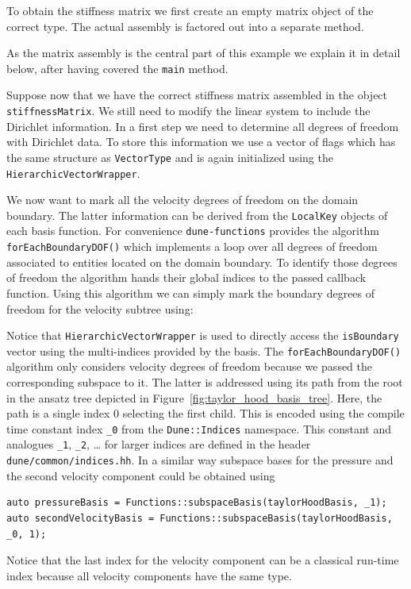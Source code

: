 \documentclass[a4paper,10pt,headings=normal,bibliography=totoc]{scrartcl}
\newcommand{\cpp}[1]{\lstinline[basicstyle=\ttfamily]!#1!}
\newcommand{\dunemodule}[1]{\texttt{#1}}
\newcommand{\file}[1]{\texttt{#1}}
\begin{document}
To obtain the stiffness matrix we first create an empty matrix object of the correct type.  The actual assembly
is factored out into a separate method.
%

%
As the matrix assembly is the central part of this example we explain it in detail below, after having covered the \cpp{main} method.

Suppose now that we have the correct stiffness matrix assembled in the object \cpp{stiffnessMatrix}.  We still need
to modify the linear system to include the Dirichlet information.
In a first step we need to determine all degrees of freedom with Dirichlet data.
To store this information we use a vector of flags which has the same structure
as \cpp{VectorType} and is again initialized using the \cpp{HierarchicVectorWrapper}.
%

%
We now want to mark all the velocity degrees of freedom on the domain boundary.
The latter information can be derived from the \cpp{LocalKey} objects of each basis function.
For convenience \dunemodule{dune-functions} provides the algorithm \cpp{forEachBoundaryDOF()}
which implements a loop over all degrees of freedom associated to entities located
on the domain boundary. To identify those degrees of freedom the algorithm
hands their global indices to the passed callback function.
Using this algorithm we can simply mark the boundary degrees of freedom
for the velocity subtree using:
%

%
Notice that \cpp{HierarchicVectorWrapper} is used to directly
access the \cpp{isBoundary} vector using the multi-indices provided by the basis.
The \cpp{forEachBoundaryDOF()} algorithm only considers velocity
degrees of freedom because we passed the corresponding subspace to it.
The latter is addressed using its path from the root in the ansatz tree
depicted in Figure~\ref{fig:taylor_hood_basis_tree}.
Here, the path is a single index $0$ selecting the first child.
This is encoded using the compile time constant index \cpp{_0} from the
\cpp{Dune::Indices} namespace. This constant and analogues \cpp{_1}, \cpp{_2}, \dots
for larger indices are defined in the header \file{dune/common/indices.hh}.
In a similar way subspace bases for the pressure and the second velocity
component could be obtained using
\begin{lstlisting}[style=Example]
auto pressureBasis = Functions::subspaceBasis(taylorHoodBasis, _1);
auto secondVelocityBasis = Functions::subspaceBasis(taylorHoodBasis, _0, 1);
\end{lstlisting}
Notice that the last index for the velocity component can be a classical run-time index
because all velocity components have the same type.
\end{document}
